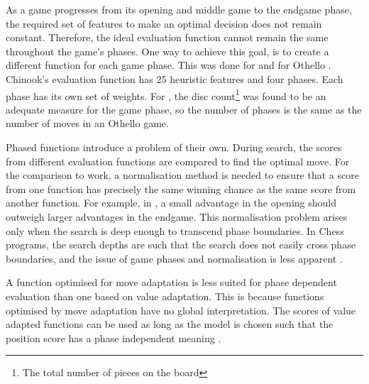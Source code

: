 As a game progresses from its opening and middle game to the endgame phase, the required set of features  to make an optimal decision does not remain constant.  Therefore, the ideal evaluation function cannot remain the same throughout the game's phases.  One way to achieve this goal, is  to create a different  function for each game phase.  This was done for  and for Othello \cite{schaeffer:solving, buro:statistical}.   Chinook's evaluation function has 25 heuristic features and four phases. Each phase has its own set of weights.  For , the disc count\footnote{The total number of pieces on the board} was found to be an adequate measure for the game phase, so the number of phases is the same as the number of moves in an Othello game.   
  
Phased functions introduce a problem of their own.  During search, the scores from different evaluation functions are compared to find the optimal move.  For the comparison to work,  a normalisation method is needed to ensure that a score from one function has precisely the same winning chance as the same score from another function.  For example, in , a small advantage in the opening should outweigh larger advantages in the endgame.  This normalisation problem arises only when the search is  deep enough to transcend phase boundaries.  In Chess programs, the search depths are such that the search does not easily cross phase boundaries, and the issue of game phases and normalisation is less apparent \cite{schaeffer:reexamination}. 

A function optimised for move adaptation is less suited for phase dependent evaluation than one based on value adaptation. This is because functions optimised by move  adaptation have no global interpretation.  The scores of value adapted functions can be used as long as the model is chosen such that the position score has a phase independent meaning \cite{buro:statistical}.


